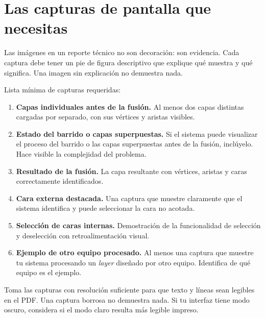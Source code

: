 \documentclass[12pt, oneside]{article}
\begin{document}
\section{Las capturas de pantalla que necesitas}
\label{sec:capturas}

Las imágenes en un reporte técnico no son decoración: son evidencia.
Cada captura debe tener un pie de figura descriptivo que explique qué
muestra y qué significa.  Una imagen sin explicación no demuestra nada.

Lista mínima de capturas requeridas:

\begin{enumerate}
  \item \textbf{Capas individuales antes de la fusión.}
        Al menos dos capas distintas cargadas por separado, con sus
        vértices y aristas visibles.

  \item \textbf{Estado del barrido o capas superpuestas.}
        Si el sistema puede visualizar el proceso del barrido o
        las capas superpuestas antes de la fusión, inclúyelo.
        Hace visible la complejidad del problema.

  \item \textbf{Resultado de la fusión.}
        La capa resultante con vértices, aristas y caras correctamente
        identificados.

  \item \textbf{Cara externa destacada.}
        Una captura que muestre claramente que el sistema identifica
        y puede seleccionar la cara no acotada.

  \item \textbf{Selección de caras internas.}
        Demostración de la funcionalidad de selección y deselección
        con retroalimentación visual.

  \item \textbf{Ejemplo de otro equipo procesado.}
        Al menos una captura que muestre tu sistema procesando un
        \textit{layer} diseñado por otro equipo.  Identifica de qué
        equipo es el ejemplo.
\end{enumerate}

\begin{consejo}
  Toma las capturas con resolución suficiente para que texto y líneas
  sean legibles en el PDF.  Una captura borrosa no demuestra nada.
  Si tu interfaz tiene modo oscuro, considera si el modo claro resulta
  más legible impreso.
\end{consejo}
\end{document}
